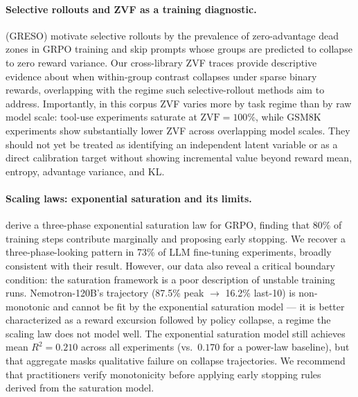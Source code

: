 \documentclass{article}
\begin{document}
\paragraph{Selective rollouts and ZVF as a training diagnostic.}
\citet{zhang2026greso} (GRESO) motivate selective rollouts by the prevalence of
zero-advantage dead zones in GRPO training and skip prompts whose groups are
predicted to collapse to zero reward variance.
Our cross-library ZVF traces provide descriptive evidence about when
within-group contrast collapses under sparse binary rewards, overlapping with
the regime such selective-rollout methods aim to address.
Importantly, in this corpus ZVF varies more by task regime than by raw model
scale: tool-use experiments saturate at $\text{ZVF} = 100\%$, while GSM8K
experiments show substantially lower ZVF across overlapping model scales.
They should not yet be treated as identifying an independent latent variable
or as a direct calibration target without showing incremental value beyond
reward mean, entropy, advantage variance, and KL.

\paragraph{Scaling laws: exponential saturation and its limits.}
\citet{nimmaturi2025scalinglaws} derive a three-phase exponential saturation
law for GRPO, finding that 80\% of training steps contribute marginally and
proposing early stopping.
We recover a three-phase-looking pattern in 73\% of LLM fine-tuning
experiments, broadly consistent with their result.
However, our data also reveal a critical boundary condition: the saturation
framework is a poor description of unstable training runs.
Nemotron-120B's trajectory (87.5\% peak $\to$ 16.2\% last-10) is
non-monotonic and cannot be fit by the exponential saturation model ---
it is better characterized as a reward excursion followed by policy
collapse, a regime the scaling law does not model well. The exponential
saturation model still achieves mean $R^{2} = 0.210$ across all experiments
(vs.\ $0.170$ for a power-law baseline), but that aggregate masks qualitative
failure on collapse trajectories.
We recommend that practitioners verify monotonicity before applying early
stopping rules derived from the saturation model.
\end{document}
